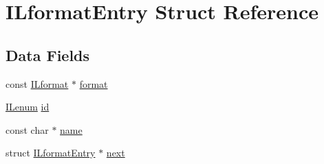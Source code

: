 \hypertarget{struct_i_lformat_entry}{\section{I\-Lformat\-Entry Struct Reference}
\label{struct_i_lformat_entry}
}
\subsection*{Data Fields}
\begin{DoxyCompactItemize}
\item 
const \hyperlink{struct_i_lformat}{I\-Lformat} $\ast$ \hyperlink{struct_i_lformat_entry_a60111efb8516f5ad535081b7b1dc1409}{format}
\item 
\hyperlink{il_8h_a1542f3a70c0c5370a30a1fa5ce349e2d}{I\-Lenum} \hyperlink{struct_i_lformat_entry_a170412aef00e5f928cc83bce78fc85c9}{id}
\item 
const char $\ast$ \hyperlink{struct_i_lformat_entry_a8f8f80d37794cde9472343e4487ba3eb}{name}
\item 
struct \hyperlink{struct_i_lformat_entry}{I\-Lformat\-Entry} $\ast$ \hyperlink{struct_i_lformat_entry_a755875449c3d959248a5519afdc0d053}{next}
\end{DoxyCompactItemize}



